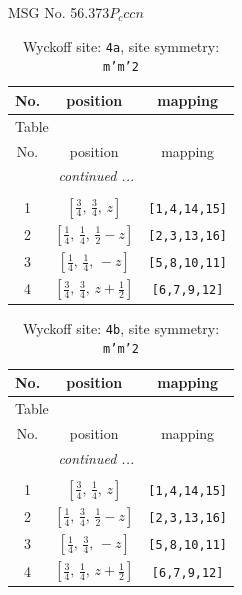 \documentclass[fleqn,8pt]{jsarticle}
\begin{document}
\setcounter{MaxMatrixCols}{32}

\renewcommand{\tablename}{Table~}
\renewcommand{\figurename}{Figure~}
\begin{center}
\LARGE
MSG No. 56.373\quad$P_{c}ccn$
\end{center}
\renewcommand{\arraystretch}{1.2}
\begin{longtable}{ccc}
\caption{Wyckoff site: {\tt 4a}, site symmetry: {\tt m'm'2}}
 \\
 \hline \hline
No. & position & mapping \\ \hline \endfirsthead

\multicolumn{2}{l}{\tablename\ \thetable{}} \\
 \hline \hline
No. & position & mapping \\ \hline \endhead

 \hline \hline
\multicolumn{2}{r}{\footnotesize\it continued ...} \\ \endfoot

 \hline \hline
\multicolumn{2}{r}{} \\ \endlastfoot

1 & $\left[ \frac{3}{4},\, \frac{3}{4},\, z \right]$ & {\tt [1,4,14,15]} \\ \hline
2 & $\left[ \frac{1}{4},\, \frac{1}{4},\, \frac{1}{2} - z \right]$ & {\tt [2,3,13,16]} \\ \hline
3 & $\left[ \frac{1}{4},\, \frac{1}{4},\, - z \right]$ & {\tt [5,8,10,11]} \\ \hline
4 & $\left[ \frac{3}{4},\, \frac{3}{4},\, z + \frac{1}{2} \right]$ & {\tt [6,7,9,12]} \\
\end{longtable}
\renewcommand{\arraystretch}{1.2}
\begin{longtable}{ccc}
\caption{Wyckoff site: {\tt 4b}, site symmetry: {\tt m'm'2}}
 \\
 \hline \hline
No. & position & mapping \\ \hline \endfirsthead

\multicolumn{2}{l}{\tablename\ \thetable{}} \\
 \hline \hline
No. & position & mapping \\ \hline \endhead

 \hline \hline
\multicolumn{2}{r}{\footnotesize\it continued ...} \\ \endfoot

 \hline \hline
\multicolumn{2}{r}{} \\ \endlastfoot

1 & $\left[ \frac{3}{4},\, \frac{1}{4},\, z \right]$ & {\tt [1,4,14,15]} \\ \hline
2 & $\left[ \frac{1}{4},\, \frac{3}{4},\, \frac{1}{2} - z \right]$ & {\tt [2,3,13,16]} \\ \hline
3 & $\left[ \frac{1}{4},\, \frac{3}{4},\, - z \right]$ & {\tt [5,8,10,11]} \\ \hline
4 & $\left[ \frac{3}{4},\, \frac{1}{4},\, z + \frac{1}{2} \right]$ & {\tt [6,7,9,12]} \\
\end{longtable}
\end{document}

